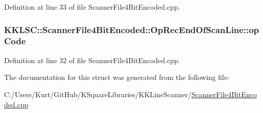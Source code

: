 Definition at line 33 of file Scanner\+File4\+Bit\+Encoded.\+cpp.

\subsubsection[{\texorpdfstring{op\+Code}{opCode}}]{ K\+K\+L\+S\+C\+::\+Scanner\+File4\+Bit\+Encoded\+::\+Op\+Rec\+End\+Of\+Scan\+Line\+::op\+Code}\hypertarget{struct_scanner_file4_bit_encoded_1_1_op_rec_end_of_scan_line_a26b256b20e4d267cbf6845f678cc4966}{}\label{struct_scanner_file4_bit_encoded_1_1_op_rec_end_of_scan_line_a26b256b20e4d267cbf6845f678cc4966}


Definition at line 32 of file Scanner\+File4\+Bit\+Encoded.\+cpp.



The documentation for this struct was generated from the following file\+:\begin{DoxyCompactItemize}
\item 
C\+:/\+Users/\+Kurt/\+Git\+Hub/\+K\+Square\+Libraries/\+K\+K\+Line\+Scanner/\hyperlink{_scanner_file4_bit_encoded_8cpp}{Scanner\+File4\+Bit\+Encoded.\+cpp}\end{DoxyCompactItemize}
